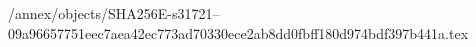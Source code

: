 /annex/objects/SHA256E-s31721--09a96657751eec7aea42ec773ad70330ece2ab8dd0fbff180d974bdf397b441a.tex
